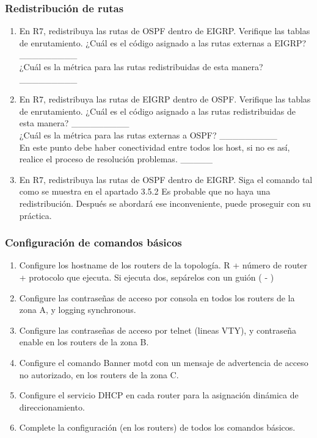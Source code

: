 \documentclass[12pt]{article}
\begin{document}
\subsubsection{Redistribución de rutas}
\begin{enumerate}[label=\Alph*]
\item En R7, redistribuya las rutas de OSPF dentro de EIGRP. Verifique las tablas de enrutamiento. ¿Cuál es el código asignado a las rutas externas a EIGRP? \_\_\_\_\_\_\_\_\_\\
¿Cuál es la métrica para las rutas redistribuidas de esta manera? \_\_\_\_\_\_\_\_\_

\item En R7, redistribuya las rutas de EIGRP dentro de OSPF. Verifique las tablas de enrutamiento.
¿Cuál es el código asignado a las rutas redistribuidas de esta manera? \_\_\_\_\_\_\_\_\_\\
¿Cuál es la métrica para las rutas externas a OSPF? \_\_\_\_\_\_\_\_\_\\

En este punto debe haber conectividad entre todos los host, si no es así, realice el proceso de resolución problemas. \_\_\_\_\_

\item En R7, redistribuya las rutas de OSPF dentro de EIGRP. Siga el comando tal como se muestra en el apartado 3.5.2 Es probable que no haya una redistribución. Después se abordará ese inconveniente, puede proseguir con su práctica.
\end{enumerate}
\subsubsection{Configuración de comandos básicos}
\begin{enumerate}
\item Configure los hostname de los routers de la topología. R + número de router + protocolo que ejecuta. Si ejecuta dos, sepárelos con un guión ( - )
\item Configure las contraseñas de acceso por consola en todos los routers de la zona A, y logging synchronous.
\item Configure las contraseñas de acceso por telnet (lineas VTY), y contraseña enable en los routers de la zona B. 
\item Configure el comando Banner motd con un mensaje de advertencia de acceso no autorizado, en los routers de la zona C.
\item Configure el servicio DHCP en cada router para la asignación dinámica de direccionamiento.
\item Complete la configuración (en los routers) de todos los comandos básicos.
\end{enumerate}

\vfill


\end{document}
